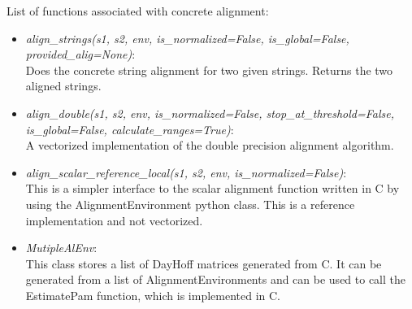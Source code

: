 \documentclass[12pt]{article}
\begin{document}
List of functions associated with concrete alignment:
\begin{itemize}
	\item \emph{align\_strings(s1, s2, env, is\_normalized=False, is\_global=False, provided\_alig=None)}:\\
	Does the concrete string alignment for two given strings. Returns the two aligned strings.
	\item \emph{align\_double(s1, s2, env, is\_normalized=False, stop\_at\_threshold=False, is\_global=False, calculate\_ranges=True)}:\\
	 A vectorized implementation of the double precision alignment algorithm.
	 \item \emph{align\_scalar\_reference\_local(s1, s2, env, is\_normalized=False)}:\\
	 This is a simpler interface to the scalar alignment function written in C by using the AlignmentEnvironment python
    class. This is a reference implementation and not vectorized.
    \item \emph{MutipleAlEnv}:\\
        This class stores a list of DayHoff matrices generated from C. It can be generated from a list of
     AlignmentEnvironments and can be used to call the EstimatePam function, which is implemented in C.
\end{itemize}
\end{document}
